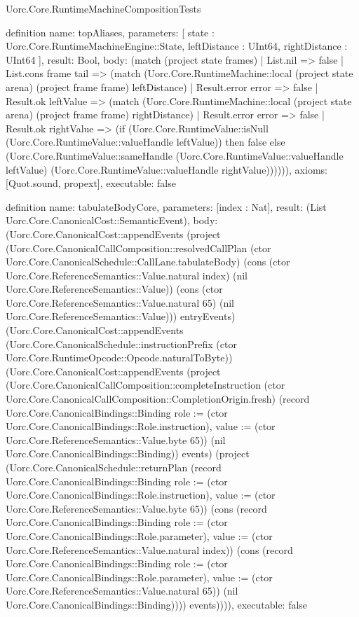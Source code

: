 \begin{lexlean}{Uorc.Core.RuntimeMachineCompositionTests}
\begin{semanticmodule}
definition{
  name: topAliases,
  parameters: [
    state : Uorc.Core.RuntimeMachineEngine::State,
    leftDistance : UInt64,
    rightDistance : UInt64
  ],
  result: Bool,
  body: (match (project state frames)
    | List.nil => false
    | List.cons frame tail => (match (Uorc.Core.RuntimeMachine::local (project state arena) (project frame frame) leftDistance)
      | Result.error error => false
      | Result.ok leftValue => (match (Uorc.Core.RuntimeMachine::local (project state arena) (project frame frame) rightDistance)
        | Result.error error => false
        | Result.ok rightValue => (if (Uorc.Core.RuntimeValue::isNull (Uorc.Core.RuntimeValue::valueHandle leftValue)) then false else (Uorc.Core.RuntimeValue::sameHandle (Uorc.Core.RuntimeValue::valueHandle leftValue) (Uorc.Core.RuntimeValue::valueHandle rightValue)))))),
  axioms: [Quot.sound, propext],
  executable: false
}

definition{
  name: tabulateBodyCore,
  parameters: [index : Nat],
  result: (List Uorc.Core.CanonicalCost::SemanticEvent),
  body: (Uorc.Core.CanonicalCost::appendEvents (project (Uorc.Core.CanonicalCallComposition::resolvedCallPlan (ctor Uorc.Core.CanonicalSchedule::CallLane.tabulateBody) (cons (ctor Uorc.Core.ReferenceSemantics::Value.natural index) (nil Uorc.Core.ReferenceSemantics::Value)) (cons (ctor Uorc.Core.ReferenceSemantics::Value.natural 65) (nil Uorc.Core.ReferenceSemantics::Value))) entryEvents) (Uorc.Core.CanonicalCost::appendEvents (Uorc.Core.CanonicalSchedule::instructionPrefix (ctor Uorc.Core.RuntimeOpcode::Opcode.naturalToByte)) (Uorc.Core.CanonicalCost::appendEvents (project (Uorc.Core.CanonicalCallComposition::completeInstruction (ctor Uorc.Core.CanonicalCallComposition::CompletionOrigin.fresh) (record Uorc.Core.CanonicalBindings::Binding {role := (ctor Uorc.Core.CanonicalBindings::Role.instruction), value := (ctor Uorc.Core.ReferenceSemantics::Value.byte 65)}) (nil Uorc.Core.CanonicalBindings::Binding)) events) (project (Uorc.Core.CanonicalSchedule::returnPlan (record Uorc.Core.CanonicalBindings::Binding {role := (ctor Uorc.Core.CanonicalBindings::Role.instruction), value := (ctor Uorc.Core.ReferenceSemantics::Value.byte 65)}) (cons (record Uorc.Core.CanonicalBindings::Binding {role := (ctor Uorc.Core.CanonicalBindings::Role.parameter), value := (ctor Uorc.Core.ReferenceSemantics::Value.natural index)}) (cons (record Uorc.Core.CanonicalBindings::Binding {role := (ctor Uorc.Core.CanonicalBindings::Role.parameter), value := (ctor Uorc.Core.ReferenceSemantics::Value.natural 65)}) (nil Uorc.Core.CanonicalBindings::Binding)))) events)))),
  executable: false
}


\end{semanticmodule}
\end{lexlean}
